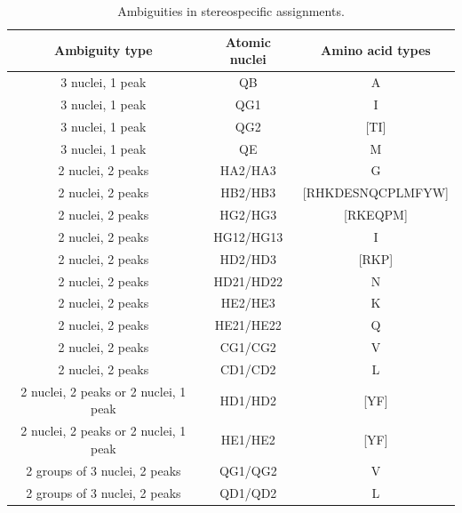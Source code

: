 \begin{table}
  \begin{tabular}{ | c | c | c |}
    \hline
    Ambiguity type     & Atomic nuclei &  Amino acid types     \\  \hline 
    3 nuclei, 1 peak   &  QB           &  A                    \\  \hline 
    3 nuclei, 1 peak   &  QG1          &  I                    \\  \hline 
    3 nuclei, 1 peak   &  QG2          &  [TI]                 \\  \hline 
    3 nuclei, 1 peak   &  QE           &  M                    \\  \hline 
    2 nuclei, 2 peaks  &  HA2/HA3      &  G                    \\  \hline 
    2 nuclei, 2 peaks  &  HB2/HB3      &  [RHKDESNQCPLMFYW]    \\  \hline 
    2 nuclei, 2 peaks  &  HG2/HG3      &  [RKEQPM]             \\  \hline 
    2 nuclei, 2 peaks  &  HG12/HG13    &  I                    \\  \hline 
    2 nuclei, 2 peaks  &  HD2/HD3      &  [RKP]                \\  \hline 
    2 nuclei, 2 peaks  &  HD21/HD22    &  N                    \\  \hline 
    2 nuclei, 2 peaks  &  HE2/HE3      &  K                    \\  \hline 
    2 nuclei, 2 peaks  &  HE21/HE22    &  Q                    \\  \hline 
    2 nuclei, 2 peaks  &  CG1/CG2      &  V                    \\  \hline 
    2 nuclei, 2 peaks  &  CD1/CD2      &  L                    \\  \hline 
    2 nuclei, 2 peaks or 2 nuclei, 1 peak  &  HD1/HD2  &  [YF]  \\  \hline 
    2 nuclei, 2 peaks or 2 nuclei, 1 peak  &  HE1/HE2  &  [YF]  \\  \hline 
    2 groups of 3 nuclei, 2 peaks  &  QG1/QG2  &  V            \\  \hline
    2 groups of 3 nuclei, 2 peaks  &  QD1/QD2  &  L            \\  \hline
  \end{tabular}
  \caption{Ambiguities in stereospecific assignments.}
  \label{stereospecific_ambiguities}
\end{table}

